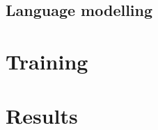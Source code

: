 \documentclass[switch, 12pt]{article}
\begin{document}
\begin{multicols}{2}
    \cite{ying-2018}

    \subsection{Language modelling}

    \section{Training}

    \section{Results}

    \newpage

    

\end{multicols}
\end{document}
